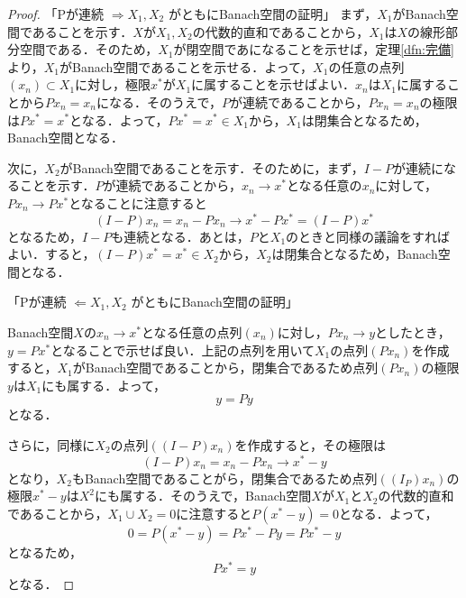 \documentclass[11pt,a4paper,titlepage]{jsreport}
\theoremstyle{definition}
\begin{document}
\begin{proof}
  「Pが連続 $\Rightarrow X_1, X_2$ がともにBanach空間の証明」
  まず，$X_1$がBanach空間であることを示す．$X$が$X_1, X_2$の代数的直和であることから，$X_1$は$X$の線形部分空間である．そのため，$X_1$が閉空間であになることを示せば，定理\ref{dfn:完備}より，$X_1$がBanach空間であることを示せる．よって，$X_1$の任意の点列$(x_n) \subset X_1$に対し，極限$x^*$が$X_1$に属することを示せばよい．$x_n$は$X_1$に属することから$Px_n = x_n$になる．そのうえで，$P$が連続であることから，$Px_n = x_n$の極限は$Px^* = x^*$となる．よって，$Px^*=x^* \in X_1$から，$X_1$は閉集合となるため，Banach空間となる．

  次に，$X_2$がBanach空間であることを示す．そのために，まず，$I-P$が連続になることを示す．$P$が連続であることから，$x_n \rightarrow x^*$となる任意の$x_n$に対して，$Px_n \rightarrow Px^*$となることに注意すると
  \begin{equation*}
    (I-P)x_n = x_n - Px_n \rightarrow x^* - P x^* = (I-P)x^*
  \end{equation*}
  となるため，$I-P$も連続となる．あとは，$P$と$X_1$のときと同様の議論をすればよい．すると，$(I-P)x^*=x^* \in X_2$から，$X_2$は閉集合となるため，Banach空間となる．


  「Pが連続 $\Leftarrow X_1, X_2$ がともにBanach空間の証明」

  Banach空間$X$の$x_n \rightarrow x^*$となる任意の点列$(x_n)$に対し，$Px_n \rightarrow y$としたとき，$y=Px^*$となることで示せば良い．上記の点列を用いて$X_1$の点列$(Px_n)$を作成すると，$X_1$がBanach空間であることから，閉集合であるため点列$(Px_n)$の極限$y$は$X_1$にも属する．よって，
  \begin{equation*}
    y=Py
  \end{equation*}
  となる．

  さらに，同様に$X_2$の点列$((I-P)x_n)$を作成すると，その極限は
  \begin{equation*}
    (I-P)x_n=x_n-Px_n \rightarrow x^*-y
  \end{equation*}
  となり，$X_2$もBanach空間であることがら，閉集合であるため点列$((I_P)x_n)$の極限$x^*-y$は$X^2$にも属する．そのうえで，Banach空間$X$が$X_1$と$X_2$の代数的直和であることから，$X_1 \cup X_2={0}$に注意すると$P(x^*-y)=0$となる．よって，
  \begin{equation*}
    0=P(x^*-y)=Px^*-Py=Px^*-y
  \end{equation*}
  となるため，
  \begin{equation*}
    Px^*=y
  \end{equation*}
  となる．
\end{proof}
\end{document}
